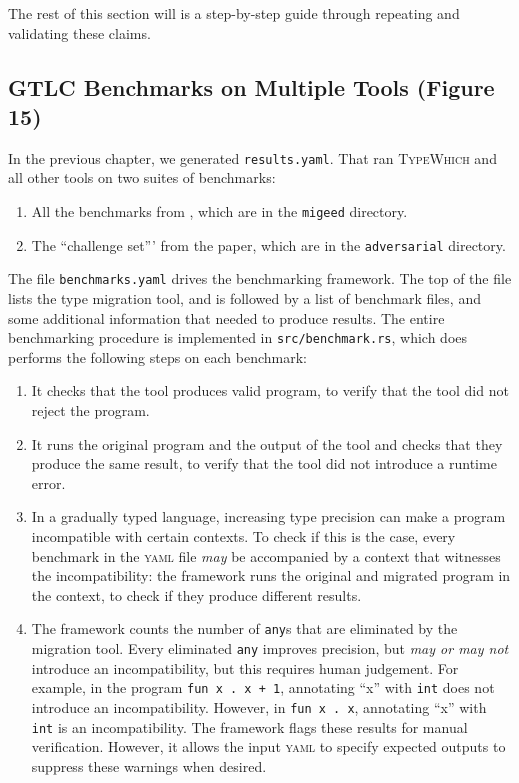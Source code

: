 \documentclass{book}
\newcommand{\system}{\textsc{TypeWhich}\xspace}
\begin{document}
The rest of this section will is a step-by-step guide through repeating and
validating these claims.

\subsection{GTLC Benchmarks on Multiple Tools (Figure 15)}

In the previous chapter, we generated \texttt{results.yaml}. That
ran \system{} and all other tools on two suites of benchmarks:
\begin{enumerate}
        
\item All the benchmarks from \citet{migeed:decidable}, which are in the
\texttt{migeed} directory.
     
\item The ``challenge set''' from the paper, which are in the 
\texttt{adversarial} directory.

\end{enumerate}

The file \texttt{benchmarks.yaml} drives the benchmarking framework.
The top of the file lists the type migration tool, and is followed by
a list of benchmark files, and some additional information that needed to
produce results. The entire
benchmarking procedure is implemented in \texttt{src/benchmark.rs}, which
does performs the following steps on each benchmark:
\begin{enumerate}

\item It checks that the tool produces valid program, to verify that the tool
did not reject the program.

\item It runs the original program and the output of the tool and checks that
they produce the same result, to verify that the tool did not introduce a
runtime error.

\item In a gradually typed language, increasing type precision can make a
program incompatible with certain contexts. To check if this is the case, every
benchmark in the \textsc{yaml} file \emph{may} be accompanied by a context that
witnesses the incompatibility: the framework runs the original and migrated
program in the context, to check if they produce different results.

\item The framework counts the number of \texttt{any}s that are eliminated
by the migration tool. Every eliminated \texttt{any} improves precision, but
\emph{may or may not} introduce an incompatibility, but this requires human
judgement. For example, in the
program \verb|fun x . x + 1|, annotating ``x'' with \texttt{int} does not
introduce an incompatibility. However, in \verb|fun x . x|, annotating ``x''
with \texttt{int} is an incompatibility. The framework flags these results
for manual verification. However, it allows the input \textsc{yaml} to specify
expected outputs to suppress these warnings when desired.

\end{enumerate}
\end{document}
